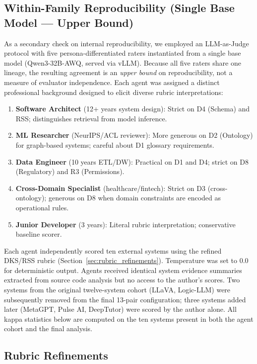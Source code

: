 \documentclass[10pt,a4paper]{article}
\begin{document}
\subsection{Within-Family Reproducibility (Single Base Model --- Upper Bound)}
\label{sec:withinfamily}

As a secondary check on internal reproducibility, we employed an LLM-as-Judge protocol with five persona-differentiated raters instantiated from a single base model (Qwen3-32B-AWQ, served via vLLM). Because all five raters share one lineage, the resulting agreement is an \emph{upper bound} on reproducibility, not a measure of evaluator independence. Each agent was assigned a distinct professional background designed to elicit diverse rubric interpretations:

\begin{enumerate}
\item \textbf{Software Architect} (12+ years system design): Strict on D4 (Schema) and RSS; distinguishes retrieval from model inference.
\item \textbf{ML Researcher} (NeurIPS/ACL reviewer): More generous on D2 (Ontology) for graph-based systems; careful about D1 glossary requirements.
\item \textbf{Data Engineer} (10 years ETL/DW): Practical on D1 and D4; strict on D8 (Regulatory) and R3 (Permissions).
\item \textbf{Cross-Domain Specialist} (healthcare/fintech): Strict on D3 (cross-ontology); generous on D8 when domain constraints are encoded as operational rules.
\item \textbf{Junior Developer} (3 years): Literal rubric interpretation; conservative baseline scorer.
\end{enumerate}

Each agent independently scored ten external systems using the refined DKS/RSS rubric (Section~\ref{sec:rubric_refinements}). Temperature was set to 0.0 for deterministic output. Agents received identical system evidence summaries extracted from source code analysis but no access to the author's scores. Two systems from the original twelve-system cohort (LLaVA, Logic-LLM) were subsequently removed from the final 13-pair configuration; three systems added later (MetaGPT, Pulse AI, DeepTutor) were scored by the author alone. All kappa statistics below are computed on the ten systems present in both the agent cohort and the final analysis.

\subsection{Rubric Refinements}
\end{document}

